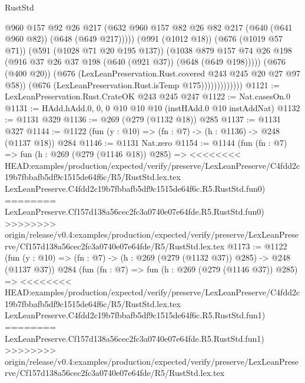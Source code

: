 \begin{lexlean}{RustStd}
\begin{coremodule}
{\begin{coremodule}
{{{{{{                                @960
                                @157
                                @92
                                @26
                                @217
                                (@632
                                  @960
                                  @157
                                  @82
                                  @26
                                  @82
                                  @217
                                  (@640 (@641 @960 @82))
                                  (@648 (@649 @217)))))
                            (@991 (@1012 @18))
                            (@676 (@1019 @57 @71))
                            (@591 (@1028 @71 @20 @195 @137))
                            (@1038
                              @879
                              @157
                              @74
                              @26
                              @198
                              (@916 @37 @26 @37 @198 (@640 (@921 @37)) (@648 (@649 @198)))))
                          (@676 (@400 @20))
                          (@676 (LexLeanPreservation.Rust.covered @243 @245 @20 @27 @97 @58))
                          (@676 (LexLeanPreservation.Rust.isTemp @175)))))))))))))
@1121 := LexLeanPreservation.Rust.CrateOK @243 @245 @247
@1122 := Nat.casesOn.{0}
@1131 := HAdd.hAdd.{0, 0, 0} @10 @10 @10 (instHAdd.{0} @10 instAddNat)
@1132 := @1131 @329
@1136 := @269 (@279 (@1132 @18)) @285
@1137 := @1131 @327
@1144 := @1122 (fun (y : @10) => (fn : @7) -> (h : @1136) -> @248 (@1137 @18)) @284
@1146 := @1131 Nat.zero
@1154 := @1144
    (fun (fn : @7) =>
    fun (h : @269 (@279 (@1146 @18)) @285) =>
<<<<<<<< HEAD:examples/production/expected/verify/preserve/LexLeanPreserve/C4fdd2c19b7fbbafb5df9c1515de64f6c/R5/RustStd.lex.tex
    LexLeanPreserve.C4fdd2c19b7fbbafb5df9c1515de64f6c.R5.RustStd.fun0)
========
    LexLeanPreserve.Cf157d138a56cec2fc3a0740e07e64fde.R5.RustStd.fun0)
>>>>>>>> origin/release/v0.4:examples/production/expected/verify/preserve/LexLeanPreserve/Cf157d138a56cec2fc3a0740e07e64fde/R5/RustStd.lex.tex
@1173 := @1122
    (fun (y : @10) => (fn : @7) -> (h : @269 (@279 (@1132 @37)) @285) -> @248 (@1137 @37))
    @284
    (fun (fn : @7) =>
    fun (h : @269 (@279 (@1146 @37)) @285) =>
<<<<<<<< HEAD:examples/production/expected/verify/preserve/LexLeanPreserve/C4fdd2c19b7fbbafb5df9c1515de64f6c/R5/RustStd.lex.tex
    LexLeanPreserve.C4fdd2c19b7fbbafb5df9c1515de64f6c.R5.RustStd.fun1)
========
    LexLeanPreserve.Cf157d138a56cec2fc3a0740e07e64fde.R5.RustStd.fun1)
>>>>>>>> origin/release/v0.4:examples/production/expected/verify/preserve/LexLeanPreserve/Cf157d138a56cec2fc3a0740e07e64fde/R5/RustStd.lex.tex
}}}}}}
\end{coremodule}}
\end{coremodule}
\end{lexlean}
